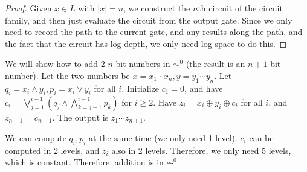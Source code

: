 \begin{proof}
Given $x \in L$ with $|x| = n$, we construct the $n$th circuit of the circuit family, and then just evaluate the circuit from the output gate. Since we only need to record the path to the current gate, and any results along the path, and the fact that the circuit has log-depth, we only need log space to do this.
\end{proof}

\begin{example}
We will show how to add 2 $n$-bit numbers in $\AC^0$ (the result is an $n+1$-bit number). Let the two numbers be $x = x_1\cdots x_n, y = y_1\cdots y_n$. Let $q_i = x_i \wedge y_i, p_i = x_i \vee y_i$ for all $i$. Initialize $c_1 = 0$, and have $c_i = \bigvee_{j=1}^{i-1} (q_j \wedge \bigwedge_{k=j+1}^{i-1}p_k)$ for $i \ge 2$. Have $z_i = x_i \oplus y_i \oplus c_i$ for all $i$, and $z_{n+1} = c_{n+1}$. The output is $z_1\cdots z_{n+1}$. 

\par We can compute $q_i, p_i$ at the same time (we only need 1 level). $c_i$ can be computed in 2 levels, and $z_i$ also in 2 levels. Therefore, we only need 5 levels, which is constant. Therefore, addition is in $\AC^0$. 
\end{example}

